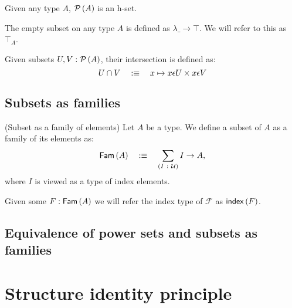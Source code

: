 \begin{prop}\label{isSetPow}
  Given any type $A$, $\mathcal{P}\left(A\right)$ is an h-set.
\end{prop}

\begin{defn}\label{defn:full-set}
  The empty subset on any type $A$ is defined as $\lambda \_ \rightarrow \top$. We will refer to this as
  $\top_A$.
\end{defn}

\begin{defn}\label{defn:set-intersection}
  Given subsets $U, V : \mathcal{P}\left(A\right)$, their intersection is defined as:
  \begin{equation*}
    U \cap V \quad:\equiv\quad x \mapsto x \epsilon U \times x \epsilon V
  \end{equation*}
\end{defn}

\subsection{Subsets as families}

\begin{defn}(Subset as a family of elements)\label{defn:fam}
  Let $A$ be a type. We define a subset of $A$ as a family of its elements as:
  \begin{equation*}
    \mathsf{Fam}\left(A\right) \quad:\equiv\quad \sum_{(I~:~\mathcal{U})} I \rightarrow A,
  \end{equation*}
  where $I$ is viewed as a type of index elements.

  Given some $F : \mathsf{Fam}\left(A\right)$ we will refer the index type of $\mathcal{F}$ as
  $\mathsf{index}{}\left(F\right)$.
\end{defn}

\subsection{Equivalence of power sets and subsets as families}


\section{Structure identity principle}\label{sec:sip}
